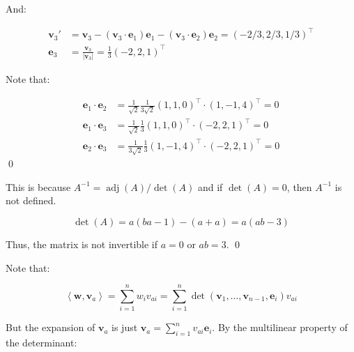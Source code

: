 \documentclass[12pt]{article}
\begin{document}
And:

\begin{equation}
    \begin{split}
        \mathbf{v}_{3}' &= \mathbf{v}_{3} - (\mathbf{v}_{3} \cdot \mathbf{e}_{1}) \mathbf{e}_{1} - (\mathbf{v}_{3} \cdot \mathbf{e}_{2}) \mathbf{e}_{2} = (-2/3, 2/3, 1/3)^{\intercal} \\
        \mathbf{e}_{3} &= \frac{\mathbf{v}_{3}}{\left\lvert \mathbf{v}_{3} \right\rvert} = \frac{1}{3} (-2, 2, 1)^{\intercal}
    \end{split}
\end{equation}

Note that:

\begin{equation}
    \begin{split}
        \mathbf{e}_{1} \cdot \mathbf{e}_{2} &= \frac{1}{\sqrt{2}} \frac{1}{3\sqrt{2}} (1, 1, 0)^{\intercal} \cdot (1, -1, 4)^{\intercal} = 0 \\
        \mathbf{e}_{1} \cdot \mathbf{e}_{3} &= \frac{1}{\sqrt{2}} \frac{1}{3} (1, 1, 0)^{\intercal} \cdot (-2, 2, 1)^{\intercal} = 0 \\
        \mathbf{e}_{2} \cdot \mathbf{e}_{3} &= \frac{1}{3\sqrt{2}} \frac{1}{3} (1, -1, 4)^{\intercal} \cdot (-2, 2, 1)^{\intercal} = 0
    \end{split}
\end{equation}
\qed



This is because $A^{-1} = \operatorname{adj}(A)/\det(A)$ and if $\det(A) = 0$, then $A^{-1}$ is not defined.


\begin{equation}
    \det(A) = a(ba - 1) - (a + a) = a(ab - 3)
\end{equation}

Thus, the matrix is not invertible if $a = 0$ or $ab = 3$.
\qed



Note that:

\begin{equation}
    \left\langle \mathbf{w}, \mathbf{v}_{a} \right\rangle = \sum_{i=1}^{n} w_{i} v_{ai} = \sum_{i=1}^{n} \det(\mathbf{v}_{1}, \dots, \mathbf{v}_{n-1}, \mathbf{e}_{i}) v_{ai}
\end{equation}

But the expansion of $\mathbf{v}_{a}$ is just $\mathbf{v}_{a} = \sum_{i=1}^{n}v_{ai} \mathbf{e}_{i}$. By the multilinear property of the determinant:
\end{document}

